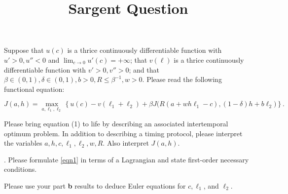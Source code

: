 \documentclass{article} %
\title{Sargent Question} %
\begin{document}
  \maketitle
{} 
Suppose that $u(c)$ is a thrice continuously differentiable function with $u' > 0, u'' < 0$ and $\lim_{c \rightarrow 0} u'(c) = + \infty$;  that $v(\ell)$ is a thrice continuously differentiable function
with $v'> 0, v'' > 0$; and  that $\beta \in (0,1),  \delta \in (0,1), b >0,  R \leq \beta^{-1}, w > 0$.  
Please read the following functional equation:

\begin{equation}\label{eqn1}
J(a,h) = \max_{a, \ell_1, \ell_2} \left\{ u(c) - v(\ell_1 + \ell_2) + \beta J \bigl(R(a+ w h \ell_1 - c), (1-\delta)  h + b \ell_2 \bigr) 
  \right\} .
\end{equation}
\medskip

 Please bring equation (1) to life by describing an associated intertemporal optimum problem. In addition to describing a
timing protocol,   please   interpret the variables $a, h, c,  \ell_1, \ell_2, w, R$. Also interpret $J(a,h)$.  %

\medskip
{}. Please formulate  \eqref{eqn1}  in terms of  a Lagrangian and state  first-order necessary  conditions.

\medskip
{} Please use your part {\bf b} results to deduce Euler equations for $c, \ell_1$, and $\ell_2$.  
\end{document}
